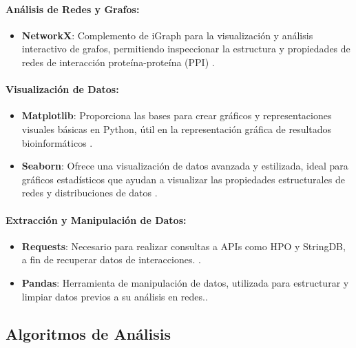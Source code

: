 \paragraph{Análisis de Redes y Grafos:}
\begin{itemize}
	\item \textbf{NetworkX}: Complemento de iGraph para la visualización y análisis interactivo de grafos, permitiendo inspeccionar la estructura y propiedades de redes de interacción proteína-proteína (PPI) \cite{hagberg2008}.
\end{itemize}

\paragraph{Visualización de Datos:}
\begin{itemize}
	\item \textbf{Matplotlib}: Proporciona las bases para crear gráficos y representaciones visuales básicas en Python, útil en la representación gráfica de resultados bioinformáticos \cite{Hunter2007}.
	\item \textbf{Seaborn}: Ofrece una visualización de datos avanzada y estilizada, ideal para gráficos estadísticos que ayudan a visualizar las propiedades estructurales de redes y distribuciones de datos \cite{Waskom2021}.
\end{itemize}

\paragraph{Extracción y Manipulación de Datos:}
\begin{itemize}
	\item \textbf{Requests}: Necesario para realizar consultas a APIs como HPO y StringDB, a fin de recuperar datos de interacciones. \cite{Requests2020}.
	\item \textbf{Pandas}: Herramienta de manipulación de datos, utilizada para estructurar y limpiar datos previos a su análisis en redes.\cite{McKinney2010}.
\end{itemize}



\subsection{Algoritmos de Análisis}



